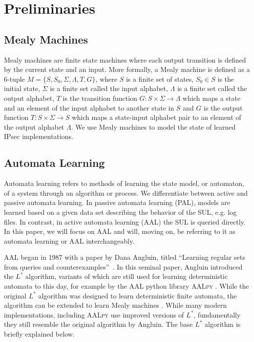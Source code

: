 %
%
% 
% 
% 

\chapter{Preliminaries}

\label{chap:Preliminaries}

\section{Mealy Machines}
Mealy machines are finite state machines where each output transition is defined by the current state and an input. More formally, a Mealy machine is defined as a 6-tuple $M = \{S, S_0, \Sigma, \Lambda, T, G\}$, where $S$ is a finite set of states, $S_0 \in S$ is the initial state, $\Sigma$ is a finite set called the input alphabet, $\Lambda$ is a finite set called the output alphabet, $T$ is the transition function $G: S \times \Sigma \rightarrow \Lambda$ which maps a state and an element of the input alphabet to another state in $S$ and $G$ is the output function $T: S \times \Sigma \rightarrow S$ which maps a state-input alphabet pair to an element of the output alphabet $\Lambda$. We use Mealy machines to model the state of learned IPsec implementations.

\section{Automata Learning}

Automata learning refers to methods of learning the state model, or automaton, of a system through an algorithm or process. We differentiate between active and passive automata learning. In passive automata learning (PAL), models are learned based on a given data set describing the behavior of the SUL, e.g. log files. In contrast, in active automata learning (AAL) the SUL is queried directly. In this paper, we will focus on AAL and will, moving on, be referring to it as automata learning or AAL interchangeably. 

AAL began in 1987 with a paper by Dana Angluin, titled ``Learning regular sets from queries and counterexamples''~\parencite{ANGLUIN198787}. In this seminal paper, Angluin introduced the $L^*$ algorithm, variants of which are still used for learning deterministic automata to this day, for example by the AAL python library \textsc{AALpy} \parencite{muvskardin2022aalpy}. While the original $L^*$ algorithm was designed to learn deterministic finite automata, the algorithm can be extended to learn Mealy machines \parencite{Niese2003AnIA}. While many modern implementations, including \textsc{AALpy} use improved versions of $L^*$, fundamentally they still resemble the original algorithm by Angluin. The base $L^*$ algorithm is briefly explained below.

